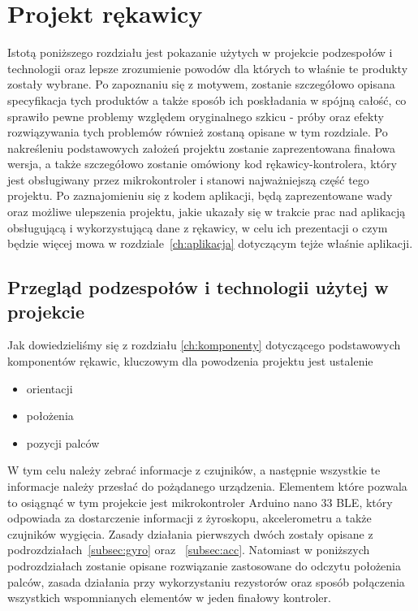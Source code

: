 \chapter{Projekt rękawicy}
\label{ch:rekawica}
Istotą poniższego rozdziału jest pokazanie użytych w projekcie podzespołów i technologii oraz lepsze zrozumienie powodów dla których to właśnie te produkty zostały wybrane. Po zapoznaniu się z motywem, zostanie szczegółowo opisana specyfikacja tych produktów a także sposób ich poskładania w spójną całość, co sprawiło pewne problemy względem oryginalnego szkicu - próby oraz efekty rozwiązywania tych problemów również zostaną opisane w tym rozdziale. Po nakreśleniu podstawowych założeń projektu zostanie zaprezentowana finałowa wersja, a także szczegółowo zostanie omówiony kod rękawicy-kontrolera, który jest obsługiwany przez mikrokontroler i stanowi najważniejszą część tego projektu.  Po zaznajomieniu się z kodem aplikacji, będą zaprezentowane wady oraz możliwe ulepszenia projektu, jakie ukazały się w trakcie prac nad aplikacją obsługującą i wykorzystującą dane z rękawicy, w celu ich prezentacji o czym będzie więcej mowa w rozdziale~\ref{ch:aplikacja} dotyczącym tejże właśnie aplikacji.

\section{Przegląd podzespołów i technologii użytej w projekcie}
\label{sec:przeglad}
Jak dowiedzieliśmy się z rozdziału \ref{ch:komponenty} dotyczącego podstawowych komponentów rękawic, kluczowym dla powodzenia projektu jest ustalenie \begin{itemize}
\item orientacji
\item położenia 
\item pozycji palców
\end{itemize} W tym celu należy zebrać informacje z czujników, a następnie wszystkie te informacje należy przesłać do pożądanego urządzenia. Elementem które pozwala to osiągnąć w tym projekcie jest mikrokontroler Arduino nano 33 BLE, który odpowiada za dostarczenie informacji z żyroskopu, akcelerometru a także czujników wygięcia. Zasady działania pierwszych dwóch zostały opisane z podrozdziałach~\ref{subsec:gyro} oraz ~\ref{subsec:acc}. Natomiast w poniższych podrozdziałach zostanie opisane rozwiązanie zastosowane do odczytu położenia palców, zasada działania przy wykorzystaniu rezystorów oraz sposób połączenia wszystkich wspomnianych elementów w jeden finałowy kontroler.
	
